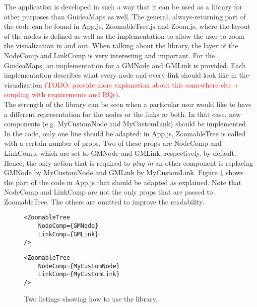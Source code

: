 The application is developed in such a way that it can be used as a library for other purposes than GuideaMaps as well. The general, always-returning part of the code can be found in App.js, ZoomableTree.js and Zoom.js, where the layout of the nodes is defined as well as the implementation to allow the user to zoom the visualization in and out. When talking about the library, the layer of the NodeComp and LinkComp is very interesting and important. For the GuideaMaps, an implementation for a GMNode and GMLink is provided. Each implementation describes what every node and every link should look like in the visualization \textcolor{red}{(TODO: provide more explanation about this somewhere else + coupling with requirements and RQs)}.\\

The strength of the library can be seen when a particular user would like to have a different representation for the nodes or the links or both. In that case, new components (e.g. MyCustomNode and MyCustomLink) should be implemented. In the code, only one line should be adapted: in App.js, ZoomableTree is called with a certain number of props. Two of these props are NodeComp and LinkComp, which are set to GMNode and GMLink, respectively, by default. Hence, the only action that is required to \textit{plug in} an other component is replacing GMNode by MyCustomNode and GMLink by MyCustomLink. Figure \ref{fig:examplecode-library} shows the part of the code in App.js that should be adapted as explained. Note that NodeComp and LinkComp are not the only props that are passed to ZoomableTree. The others are omitted to improve the readability.

\begin{figure}[H]
	\begin{minipage}{0.5\textwidth}
 		 \centering
		 \begin{verbatim}
<ZoomableTree
    NodeComp={GMNode}
    LinkComp={GMLink}
/>
		\end{verbatim}
		\label{lst:default-components}
	\end{minipage}
 	\begin{minipage}{0.5\textwidth}
  		\centering
  		\begin{verbatim}
<ZoomableTree
    NodeComp={MyCustomNode}
    LinkComp={MyCustomLink}
/>
		\end{verbatim}
		\label{lst:custom-components}
 	\end{minipage}
	\caption{Two listings showing how to use the library.}
	\label{fig:examplecode-library}
\end{figure}





